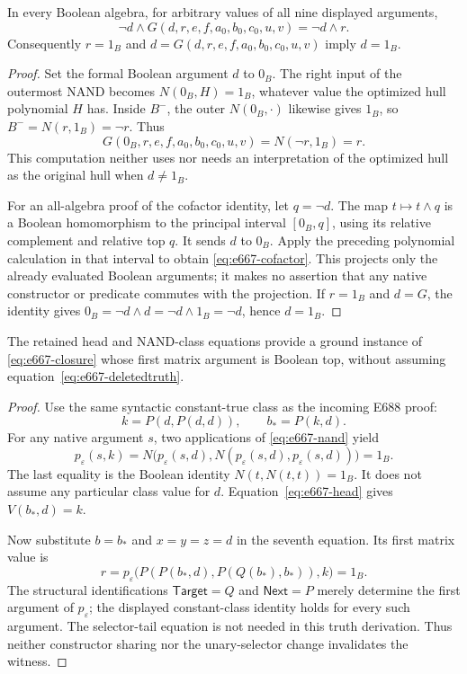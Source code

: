 \begin{lemma}
In every Boolean algebra, for arbitrary values of all nine displayed
arguments,
\[
 \neg d\wedge G(d,r,e,f,a_0,b_0,c_0,u,v)=\neg d\wedge r.
 \tag{Cofactor}\label{eq:e667-cofactor}
\]
Consequently $r=1_B$ and $d=G(d,r,e,f,a_0,b_0,c_0,u,v)$ imply $d=1_B$.
\end{lemma}
\begin{proof}
Set the formal Boolean argument $d$ to $0_B$. The right input of the
outermost NAND becomes $N(0_B,H)=1_B$, whatever value the optimized hull
polynomial $H$ has. Inside $B^-$, the outer $N(0_B,\cdot)$ likewise
gives $1_B$, so $B^-=N(r,1_B)=\neg r$. Thus
\[
 G(0_B,r,e,f,a_0,b_0,c_0,u,v)=N(\neg r,1_B)=r.
\]
This computation neither uses nor needs an interpretation of the
optimized hull as the original hull when $d\ne1_B$.

For an all-algebra proof of the cofactor identity, let $q=\neg d$.
The map $t\mapsto t\wedge q$ is a Boolean homomorphism to the principal
interval $[0_B,q]$, using its relative complement and relative top $q$.
It sends $d$ to $0_B$. Apply the preceding polynomial calculation in
that interval to obtain \eqref{eq:e667-cofactor}. This projects only
the already evaluated Boolean arguments; it makes no assertion that
any native constructor or predicate commutes with the projection.
If $r=1_B$ and $d=G$, the identity gives
$0_B=\neg d\wedge d=\neg d\wedge1_B=\neg d$, hence $d=1_B$.
\end{proof}

\begin{lemma}[A ground closure instance has $r=1_B$]
The retained head and NAND-class equations provide a ground instance of
\eqref{eq:e667-closure} whose first matrix argument is Boolean top,
without assuming equation~\eqref{eq:e667-deletedtruth}.
\end{lemma}
\begin{proof}
Use the same syntactic constant-true class as the incoming E688 proof:
\[
 k=P(d,P(d,d)),\qquad b_*=P(k,d).
\]
For any native argument $s$, two applications of
\eqref{eq:e667-nand} yield
\[
 p_\varepsilon(s,k)=N\bigl(p_\varepsilon(s,d),
             N(p_\varepsilon(s,d),p_\varepsilon(s,d))\bigr)=1_B.
\]
The last equality is the Boolean identity $N(t,N(t,t))=1_B$.
It does not assume any particular class value for $d$.
Equation~\eqref{eq:e667-head} gives $V(b_*,d)=k$.

Now substitute $b=b_*$ and $x=y=z=d$ in the seventh equation. Its
first matrix value is
\[
 r=p_\varepsilon\bigl(P(P(b_*,d),P(Q(b_*),b_*)),k\bigr)=1_B.
\]
The structural identifications $\mathsf{Target}=Q$ and
$\mathsf{Next}=P$ merely determine the first argument of
$p_\varepsilon$; the displayed constant-class identity holds for every
such argument. The selector-tail equation is not needed in this truth
derivation. Thus neither constructor sharing nor the unary-selector
change invalidates the witness.
\end{proof}

